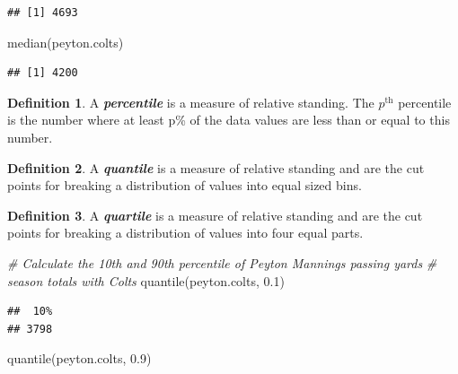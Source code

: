 \documentclass[
  11pt,
]{book}
\newenvironment{Shaded}{\begin{snugshade}}{\end{snugshade}}
\newcommand{\CommentTok}[1]{\textcolor[rgb]{0.56,0.35,0.01}{\textit{#1}}}
\newcommand{\FloatTok}[1]{\textcolor[rgb]{0.00,0.00,0.81}{#1}}
\newcommand{\FunctionTok}[1]{\textcolor[rgb]{0.00,0.00,0.00}{#1}}
\newcommand{\NormalTok}[1]{#1}
\theoremstyle{definition}
\newtheorem{definition}{Definition}[chapter]
\theoremstyle{definition}
\theoremstyle{definition}
\theoremstyle{definition}
\theoremstyle{remark}
\begin{document}
\begin{verbatim}
## [1] 4693
\end{verbatim}

\begin{Shaded}
\begin{Highlighting}[]
\FunctionTok{median}\NormalTok{(peyton.colts)}
\end{Highlighting}
\end{Shaded}

\begin{verbatim}
## [1] 4200
\end{verbatim}

\begin{definition}
A \textbf{\emph{percentile}} is a measure of relative standing. The \(p^\text{th}\) percentile is the number where at least
p\% of the data values are less than or equal to this number.
\end{definition}

\begin{definition}
A \textbf{\emph{quantile}} is a measure of relative standing and are the cut points for breaking a distribution of values into equal sized bins.
\end{definition}

\begin{definition}
A \textbf{\emph{quartile}} is a measure of relative standing and are the cut points for breaking a distribution of values into four equal parts.
\end{definition}

\begin{Shaded}
\begin{Highlighting}[]
\CommentTok{\# Calculate the 10th and 90th percentile of Peyton Manning\textquotesingle{}s passing yards}
\CommentTok{\# season totals with Colts}
\FunctionTok{quantile}\NormalTok{(peyton.colts, }\FloatTok{0.1}\NormalTok{)}
\end{Highlighting}
\end{Shaded}

\begin{verbatim}
##  10% 
## 3798
\end{verbatim}

\begin{Shaded}
\begin{Highlighting}[]
\FunctionTok{quantile}\NormalTok{(peyton.colts, }\FloatTok{0.9}\NormalTok{)}
\end{Highlighting}
\end{Shaded}
\end{document}
